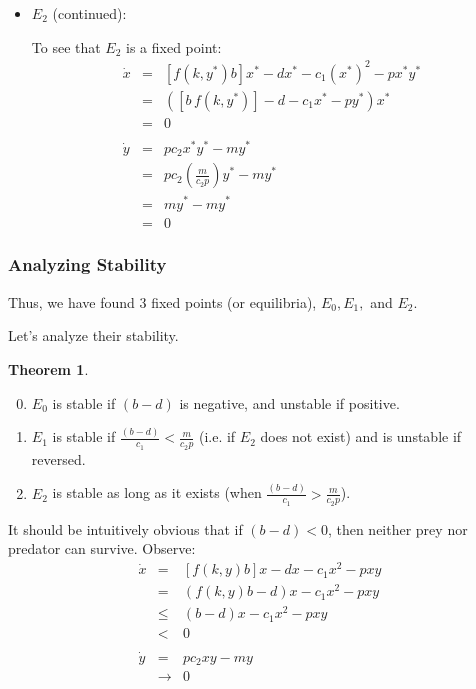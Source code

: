 \documentclass[a5paper]{article}
\theoremstyle{definition}%
\newtheorem*{theorem*}{Theorem} %
\numberwithin{exercise}{section}
\theoremstyle{remark}%
\begin{document}

\begin{itemize}
\item $E_2$ (continued): 

\mbox{}

To see that $E_2$ is a fixed point: 
\[\begin{array}{rcl}
\dot{x}&=&[f(k,y^*)b]x^*-dx^*-c_1(x^*)^2-px^*y^*\\
&=&([b\,f(k,y^*)]-d-c_1x^*-py^*)x^*\\
&=&0\\
\\
\dot{y}&=&pc_2x^*y^*-my^*\\
&=&pc_2\left(\frac{m}{c_2p}\right)y^*-my^*\\
&=&my^*-my^*\\
&=&0
\end{array}\]
\end{itemize}

\subsubsection*{Analyzing Stability}
Thus, we have found 3 fixed points (or equilibria), $E_0, E_1,$ and $E_2$.

Let's analyze their stability. 
\begin{highlight}
\begin{theorem*}\mbox{}
\begin{enumerate}
\setcounter{enumi}{-1}
\item $E_0$ is stable if $(b-d)$ is negative, and unstable if positive.
\item $E_1$ is stable if $\frac{(b-d)}{c_1}<\frac{m}{c_2p}$ (i.e. if $E_2$ does not exist) and is unstable if reversed.
\item $E_2$ is stable as long as it exists (when $\frac{(b-d)}{c_1}>\frac{m}{c_2p}$). 
\end{enumerate}
\end{theorem*}
\end{highlight}

It should be intuitively obvious that if $(b-d)<0$, then neither prey nor predator can survive. Observe:
\[\begin{array}{rcl}
\dot{x}&=&[f(k,y)b]x-dx-c_1x^2-pxy\\
&=&(f(k,y)b-d)x-c_1x^2-pxy\\
&\leq&(b-d)x-c_1x^2-pxy\\
&<&0\\
\\
\dot{y}&=&pc_2xy-my\\
&\to&0
\end{array}\]
\end{document}
